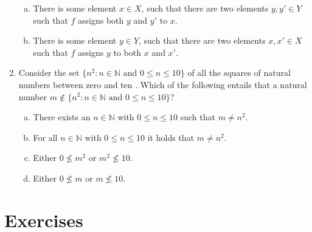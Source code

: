\begin{enumerate}[\thesection.1]
\begin{enumerate}[(a)]
          \item There is some element $x\in X$, such that there are two elements $y,y'\in Y$ such that $f$ assigns both $y$ and $y'$ to $x$.

          \item There is some element $y\in Y$, such that there are two elements $x,x'\in X$ such that $f$ assigns $y$ to both $x$ and $x'$.

        \end{enumerate}

	\item Consider the set $\{n^2:n\in\mathbb{N}\text{ and }0\leq n\leq 10\}$ of all the squares of natural numbers between zero and ten . Which of the following entails that a natural number $m\notin\{n^2:n\in\mathbb{N}\text{ and }0\leq n\leq 10\}$?
	
	\begin{enumerate}[(a)]
	
		\item There exists an $n\in\mathbb{N}$ with $0\leq n\leq 10$ such that $m\neq n^2$.
		
		\item For all $n\in\mathbb{N}$ with $0\leq n\leq 10$ it holds that $m\neq n^2$.
		
		\item Either $0\nleq m^2$ or $m^2\nleq 10$.
		
		\item Either $0\nleq m$ or $m\nleq 10$. 
		

	
	\end{enumerate}

	\end{enumerate}


\section{Exercises}
	
